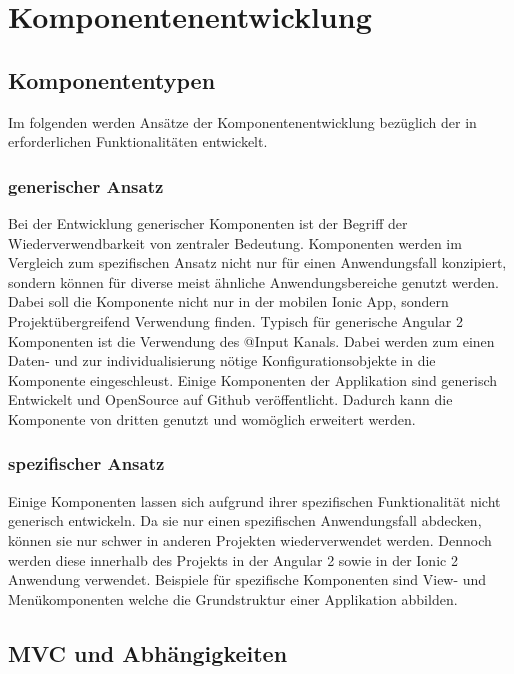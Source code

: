 \section{Komponentenentwicklung}

\subsection{Komponententypen}

Im folgenden werden Ansätze der Komponentenentwicklung bezüglich der in
\projectname{} erforderlichen Funktionalitäten entwickelt.


\subsubsection{generischer Ansatz}

Bei der Entwicklung generischer Komponenten ist der Begriff der Wiederverwendbarkeit von zentraler Bedeutung.
Komponenten werden im Vergleich zum spezifischen Ansatz nicht nur für einen Anwendungsfall konzipiert, sondern können
für diverse meist ähnliche Anwendungsbereiche genutzt werden. Dabei soll die Komponente nicht nur in der mobilen Ionic App,
sondern Projektübergreifend Verwendung finden.
Typisch für generische Angular 2 Komponenten ist die Verwendung des @Input Kanals.
Dabei werden zum einen Daten- und zur individualisierung nötige Konfigurationsobjekte in die Komponente eingeschleust.
Einige Komponenten der Applikation \projectname{} sind
generisch Entwickelt und OpenSource auf Github veröffentlicht.
Dadurch kann die Komponente von dritten genutzt und womöglich erweitert werden.


\subsubsection{spezifischer Ansatz}

Einige Komponenten lassen sich aufgrund ihrer spezifischen Funktionalität nicht generisch entwickeln.
Da sie nur einen spezifischen Anwendungsfall abdecken, können sie nur schwer in anderen Projekten wiederverwendet werden.
Dennoch werden diese innerhalb des Projekts \projectname{}
in der Angular 2 sowie in der Ionic 2 Anwendung verwendet.
Beispiele für spezifische Komponenten sind View- und Menükomponenten welche die Grundstruktur einer Applikation abbilden.

\subsection{MVC und Abhängigkeiten}

